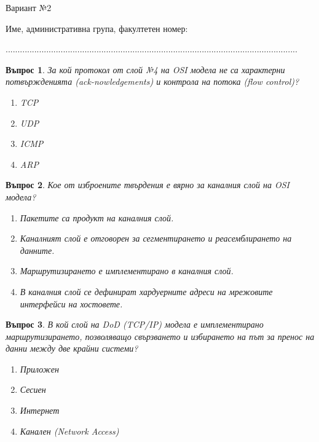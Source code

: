 \documentclass[11pt]{scrartcl}
\newtheorem{q}{Въпрос}
\newenvironment{defractors}{
\begin{enumerate}
  \setlength{\itemsep}{1pt}
  \setlength{\parskip}{0pt}
  \setlength{\parsep}{0pt}
}{\end{enumerate}}
\begin{document}
\title{}
\subtitle{\textrm{Вариант 2}}
\author{}
\date{}

\begin{center}
  Вариант №2
\end{center}

\begin{center}
Име, административна група, факултетен номер:

\end{center}

\begin{center}
..........................................................................................................................
\end{center}

\begin{q}
  За кой протокол от слой №4 на OSI модела не са характерни потвържденията
  (ack-nowledgements) и контрола на потока (flow control)?

  \begin{defractors}
  \item TCP
  \item UDP
  \item ICMP
  \item ARP
  \end{defractors}
\end{q}

\begin{q}
  Кое от изброените твърдения е вярно за каналния слой на OSI модела?

  \begin{defractors}
    \item Пакетите са продукт на каналния слой.
    \item Каналният слой е отговорен за сегментирането и реасемблирането на данните.
    \item Маршрутизирането е имплементирано в каналния слой.
    \item В каналния слой се дефинират хардуерните адреси на мрежовите интерфейси на хостовете.
  \end{defractors}
\end{q}

\begin{q}
  В кой слой на DoD (TCP/IP) модела е имплементирано маршрутизирането,
  позволяващо свързването и избирането на път за пренос на данни между две
  крайни системи?

  \begin{defractors}
  \item Приложен
  \item Сесиен
  \item Интернет
  \item Канален (Network Access)
  \end{defractors}
\end{q}
\end{document}
